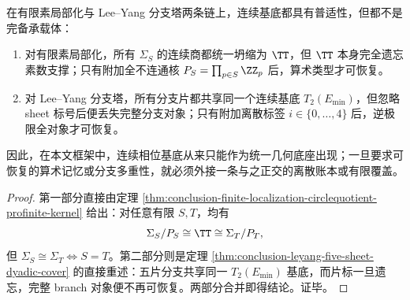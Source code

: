 \begin{theorem}[连续基底的普适性与非完备性]\label{thm:conclusion-continuous-base-universal-incomplete}
在有限素局部化与 Lee--Yang 分支塔两条链上，连续基底都具有普适性，但都不是完备承载体：
\begin{enumerate}
  \item 对有限素局部化，所有 \(\Sigma_S\) 的连续商都统一坍缩为 \(\TT\)，但 \(\TT\) 本身完全遗忘素数支撑；只有附加全不连通核 \(P_S=\prod_{p\in S}\ZZ_p\) 后，算术类型才可恢复。
  \item 对 Lee--Yang 分支塔，所有分支片都共享同一个连续基底 \(T_2(E_{\min})\)，但忽略 sheet 标号后便丢失完整分支对象；只有附加离散标签 \(i\in\{0,\dots,4\}\) 后，逆极限全对象才可恢复。
\end{enumerate}
因此，在本文框架中，连续相位基底从来只能作为统一几何底座出现；一旦要求可恢复的算术记忆或分支多重性，就必须外接一条与之正交的离散账本或有限覆盖。
\end{theorem}
\begin{proof}
第一部分直接由定理 \ref{thm:conclusion-finite-localization-circlequotient-profinite-kernel} 给出：对任意有限 \(S,T\)，均有
\[
\Sigma_S/P_S\cong \TT\cong \Sigma_T/P_T,
\]
但 \(\Sigma_S\cong\Sigma_T\iff S=T\)。第二部分则是定理 \ref{thm:conclusion-leyang-five-sheet-dyadic-cover} 的直接重述：五片分支共享同一 \(T_2(E_{\min})\) 基底，而片标一旦遗忘，完整 branch 对象便不再可恢复。两部分合并即得结论。证毕。
\end{proof}

